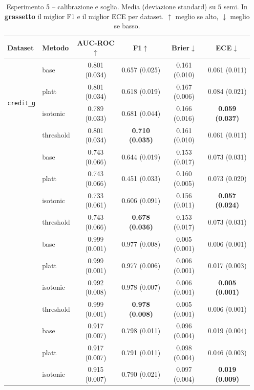 \begin{table}[h]
\centering
\caption{Esperimento 5 -- calibrazione e soglia. Media (deviazione standard)
su $5$ semi. In \textbf{grassetto} il miglior F1 e il miglior ECE per dataset.
$\uparrow$ meglio se alto, $\downarrow$ meglio se basso.}
\label{tab:calib}
\small
\setlength{\tabcolsep}{4pt}
\begin{tabular}{llcccc}
\toprule
Dataset & Metodo & AUC-ROC$\uparrow$ & F1$\uparrow$ & Brier$\downarrow$ & ECE$\downarrow$ \\
\midrule
\multirow{4}{*}{\texttt{credit\_g}}
 & base      & 0.801 (0.034) & 0.657 (0.025) & 0.161 (0.010) & 0.061 (0.011) \\
 & platt     & 0.801 (0.034) & 0.618 (0.019) & 0.167 (0.006) & 0.084 (0.021) \\
 & isotonic  & 0.789 (0.033) & 0.681 (0.044) & 0.166 (0.016) & \textbf{0.059 (0.037)} \\
 & threshold & 0.801 (0.034) & \textbf{0.710 (0.035)} & 0.161 (0.010) & 0.061 (0.011) \\
\addlinespace
\multirow{4}{*}{\texttt{blood\_transfusion}}
 & base      & 0.743 (0.066) & 0.644 (0.019) & 0.153 (0.017) & 0.073 (0.031) \\
 & platt     & 0.743 (0.066) & 0.451 (0.033) & 0.160 (0.005) & 0.073 (0.020) \\
 & isotonic  & 0.733 (0.061) & 0.606 (0.091) & 0.156 (0.011) & \textbf{0.057 (0.024)} \\
 & threshold & 0.743 (0.066) & \textbf{0.678 (0.036)} & 0.153 (0.017) & 0.073 (0.031) \\
\addlinespace
\multirow{4}{*}{\texttt{thyroid}}
 & base      & 0.999 (0.001) & 0.977 (0.008) & 0.005 (0.001) & 0.006 (0.001) \\
 & platt     & 0.999 (0.001) & 0.977 (0.006) & 0.006 (0.001) & 0.017 (0.003) \\
 & isotonic  & 0.992 (0.008) & 0.978 (0.007) & 0.006 (0.001) & \textbf{0.005 (0.001)} \\
 & threshold & 0.999 (0.001) & \textbf{0.978 (0.008)} & 0.005 (0.001) & 0.006 (0.001) \\
\addlinespace
\multirow{4}{*}{\texttt{adult}}
 & base      & 0.917 (0.007) & 0.798 (0.011) & 0.096 (0.004) & 0.019 (0.004) \\
 & platt     & 0.917 (0.007) & 0.791 (0.011) & 0.098 (0.004) & 0.046 (0.003) \\
 & isotonic  & 0.915 (0.007) & 0.790 (0.021) & 0.097 (0.004) & \textbf{0.019 (0.009)} \\

\end{tabular}
\end{table}
